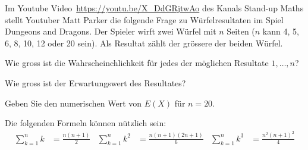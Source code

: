 Im Youtube Video~\url{https://youtu.be/X_DdGRjtwAo} des Kanals
Stand-up Maths stellt Youtuber Matt Parker die folgende Frage
zu Würfelresultaten im Spiel Dungeons and Dragons.
Der Spieler wirft zwei Würfel mit $n$ Seiten
($n$ kann 4, 5, 6, 8, 10, 12 oder 20 sein).
Als Resultat zählt der grössere der beiden Würfel.
\begin{teilaufgaben}
\item
Wie gross ist die Wahrscheinchlichkeit für jedes der möglichen
Resultate $1,\dots,n$?
\item
Wie gross ist der Erwartungswert des Resultates?
\item
Geben Sie den numerischen Wert von $E(X)$ für $n=20$.
\end{teilaufgaben}

\begin{hinweis}
Die folgenden Formeln können nützlich sein:
\begin{align*}
\sum_{k=1}^n k &= \frac{n(n+1)}{2}
&
\sum_{k=1}^n k^2 &= \frac{n(n+1)(2n+1)}{6}
&
\sum_{k=1}^n k^3 &= \frac{n^2(n+1)^2}{4}
\end{align*}
\end{hinweis}

